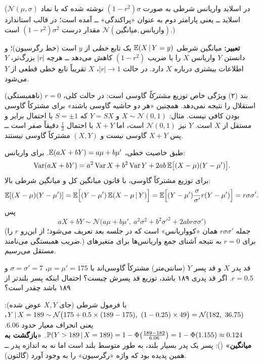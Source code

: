 \begin{note}
\notetitle (در اسلاید واریانس شرطی به صورت $(1-r^2)\sigma$ نوشته شده که با نماد $\mathcal N(\mu,\sigma)$ اسلاید ــ یعنی پارامتر دوم به عنوان «پراکندگی» ــ آمده است؛ در قالب استاندارد $\mathcal N(\text{میانگین},\text{واریانس})$ مقدار درست $(1-r^2)\sigma^2$ است.)

\textbf{تعبیر:} میانگین شرطی $\mathbb{E}(X\,|\, Y=y)$ یک تابع \emph{خطی} از $y$ است (خط رگرسیون)؛ و دانستن $Y$ واریانس $X$ را با ضریب $(1-r^2)$ کاهش می‌دهد ــ هرچه $|r|$ بزرگ‌تر، $Y$ اطلاعات بیشتری درباره $X$ دارد. در حالت $|r|\to1$، $X$ تقریباً تابع خطی قطعی از $Y$ می‌شود.
\end{note}

\begin{warning}
\warntitle بند (۲) ویژگی خاص توزیع \emph{مشترکاً} گاوسی است: در حالت کلی، $r=0$ (ناهمبستگی) استقلال را نتیجه نمی‌دهد. همچنین «هر دو حاشیه گاوسی باشند» برای مشترکاً گاوسی بودن کافی نیست. مثال: $X\sim\mathcal N(0,1)$ و $Y=SX$ که $S=\pm1$ با احتمال برابر و مستقل از $X$ است. $Y$ نیز $\mathcal N(0,1)$ است، اما $X+Y$ با احتمال $\frac12$ دقیقاً صفر است ــ پس $X+Y$ گاوسی نیست و $(X,Y)$ مشترکاً گاوسی نیستند.
\end{warning}

\begin{question}
\begin{answer}
طبق خاصیت خطی، $\mathbb{E}(aX+bY)=a\mu+b\mu'$. برای واریانس:
\[
\operatorname{Var}(aX+bY)=a^2\operatorname{Var} X+b^2\operatorname{Var} Y+2ab\,\mathbb{E}\big[(X-\mu)(Y-\mu')\big].
\]
برای توزیع مشترکاً گاوسی، با قانون میانگین کل و میانگین شرطی بالا:
\[
\mathbb{E}[(X-\mu)(Y-\mu')]=\mathbb{E}\Big[(Y-\mu')\,\mathbb{E}(X-\mu\,|\, Y)\Big]=\mathbb{E}\Big[(Y-\mu')\frac{\sigma}{\sigma'}r(Y-\mu')\Big]=r\sigma\sigma' .
\]
پس
\[
\boxed{\ aX+bY\sim\mathcal N\big(a\mu+b\mu',\ a^2\sigma^2+b^2\sigma'^2+2abr\sigma\sigma'\big)\ }
\]
(جمله $r\sigma\sigma'$ همان «کوواریانس» است که در جلسه بعد تعریف می‌شود؛ از این‌رو $r$ را ضریب همبستگی می‌نامند.) برای $r=0$ به نتیجه آشنای جمع واریانس‌ها برای متغیرهای مستقل می‌رسیم.
\end{answer}
\end{question}

\begin{example}
قد پدر $X$ و قد پسر $Y$ (سانتی‌متر) مشترکاً گاوسی‌اند با $\mu=\mu'=175$، $\sigma=\sigma'=7$ و $r=0.5$. اگر قد پدری ۱۸۹ باشد، توزیع قد پسرش چیست؟ احتمال اینکه پسر بلندتر از ۱۸۹ باشد چقدر است؟
\begin{solution}
با فرمول شرطی (جای $X,Y$ عوض شده): $Y\given X=189\sim\mathcal N\big(175+0.5\times(189-175),\ (1-0.25)\times49\big)=\mathcal N(182,\ 36.75)$، یعنی انحراف معیار حدود $6.06$.
$\mathbb{P}(Y>189\,|\, X=189)=1-\Phi\big(\frac{189-182}{6.06}\big)=1-\Phi(1.155)\approx0.124$.
\textbf{«بازگشت به میانگین»} (): پسر یک پدر بسیار بلند، به طور متوسط بلند است اما نه به اندازه پدر ــ همین پدیده بود که واژه «رگرسیون» را به وجود آورد (گالتون).
\end{solution}
\end{example}

